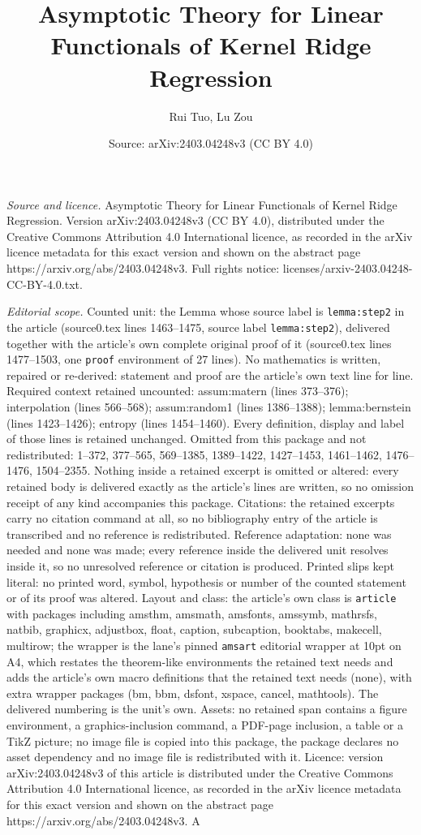 \documentclass[10pt,a4paper]{amsart}
\title[Asymptotic Theory for Linear Functionals of Kernel Ridge Reg]{Asymptotic Theory for Linear Functionals of Kernel Ridge Regression}
\author{Rui Tuo, Lu Zou}
\date{Source: arXiv:2403.04248v3 (CC BY 4.0)}
\begin{document}
\maketitle

\noindent\emph{Source and licence.} Asymptotic Theory for Linear Functionals of Kernel Ridge Regression. Version arXiv:2403.04248v3 (CC BY 4.0), distributed under the Creative Commons Attribution 4.0 International licence, as recorded in the arXiv licence metadata for this exact version and shown on the abstract page https://arxiv.org/abs/2403.04248v3. Full rights notice: licenses/arxiv-2403.04248-CC-BY-4.0.txt.\par\smallskip

\noindent\textit{Editorial scope.} Counted unit: the Lemma whose source label is \texttt{lemma:step2} in the article (source0.tex lines 1463--1475, source label \texttt{lemma:step2}), delivered together with the article's own complete original proof of it (source0.tex lines 1477--1503, one \texttt{proof} environment of 27 lines). No mathematics is written, repaired or re-derived: statement and proof are the article's own text line for line. Required context retained uncounted: assum:matern (lines 373--376); interpolation (lines 566--568); assum:random1 (lines 1386--1388); lemma:bernstein (lines 1423--1426); entropy (lines 1454--1460). Every definition, display and label of those lines is retained unchanged. Omitted from this package and not redistributed: 1--372, 377--565, 569--1385, 1389--1422, 1427--1453, 1461--1462, 1476--1476, 1504--2355. Nothing inside a retained excerpt is omitted or altered: every retained body is delivered exactly as the article's lines are written, so no omission receipt of any kind accompanies this package. Citations: the retained excerpts carry no citation command at all, so no bibliography entry of the article is transcribed and no reference is redistributed. Reference adaptation: none was needed and none was made; every reference inside the delivered unit resolves inside it, so no unresolved reference or citation is produced. Printed slips kept literal: no printed word, symbol, hypothesis or number of the counted statement or of its proof was altered. Layout and class: the article's own class is \texttt{article} with packages including amsthm, amsmath, amsfonts, amssymb, mathrsfs, natbib, graphicx, adjustbox, float, caption, subcaption, booktabs, makecell, multirow; the wrapper is the lane's pinned \texttt{amsart} editorial wrapper at 10pt on A4, which restates the theorem-like environments the retained text needs and adds the article's own macro definitions that the retained text needs (none), with extra wrapper packages (bm, bbm, dsfont, xspace, cancel, mathtools). The delivered numbering is the unit's own. Assets: no retained span contains a figure environment, a graphics-inclusion command, a PDF-page inclusion, a table or a TikZ picture; no image file is copied into this package, the package declares no asset dependency and no image file is redistributed with it. Licence: version arXiv:2403.04248v3 of this article is distributed under the Creative Commons Attribution 4.0 International licence, as recorded in the arXiv licence metadata for this exact version and shown on the abstract page https://arxiv.org/abs/2403.04248v3. A 
\end{document}
